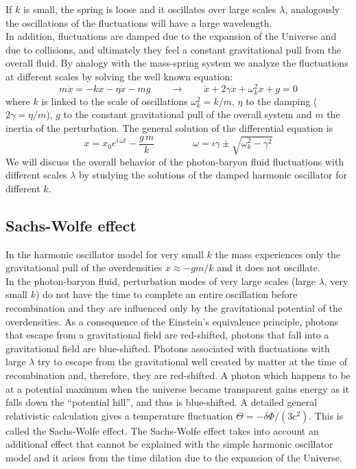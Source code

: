 \documentclass{article}
\begin{document}
If $k$ is small, the spring is loose and it  oscillates over large scales $\lambda$, analogously the oscillations of the fluctuations will have a large wavelength. \\ 
In addition, fluctuations are damped due to the expansion of the Universe and due to collisions, and ultimately they feel a constant gravitational pull from the overall fluid.
By analogy with the mass-spring system we analyze the fluctuations at different scales by solving the well known equation:
\begin{equation}
m\ddot{x} = - k x - \eta \dot{x} - m g \qquad \rightarrow \qquad \ddot{x} + 2 \gamma \dot{x} + \omega_k ^2 x + g =0
\end{equation}
where $k$ is linked to the scale of oscillations $\omega_k ^2 = k/m$, $\eta$ to the damping ($2 \gamma = \eta /m$), $g$ to the constant gravitational pull of the overall system and $m$ the inertia of the perturbation.
The general solution of the differential equation is 
\begin{equation}
x = x_0 e^{i \, \omega t} - \dfrac{g \, m}{k} \qquad \qquad \omega = i \gamma \pm \sqrt{ \omega_k ^2 - \gamma^2}
\end{equation}
We will discuss the overall behavior of the photon-baryon fluid fluctuations with different scales $\lambda$ by studying the solutions of the damped harmonic oscillator for different $k$.


\subsection{Sachs-Wolfe effect}
In the harmonic oscillator model for very small $k$ the mass experiences only the gravitational pull of the overdensities $x \approx - g m/k$ and it does not oscillate.\\
In the photon-baryon fluid, perturbation modes of very large scales (large $\lambda$, very small $k$) do not have the time to complete an entire oscillation before recombination and they are influenced only by the gravitational potential of the overdensities.
As a consequence of the Einstein's equivalence principle, photons that escape from a gravitational field are red-shifted, photons that fall into a gravitational field are blue-shifted.
Photons associated with fluctuations with large $\lambda$ try to escape from the gravitational well created by matter at the time of recombination and, therefore, they are red-shifted.
A photon which happens to be at a potential maximum when the universe became transparent gains energy as it falls down the “potential hill”, and thus is blue-shifted.
A detailed general relativistic calculation gives a temperature fluctuation $\Theta = -\delta \Phi /(3c^2)$.
This is called the Sachs-Wolfe effect.
The Sachs-Wolfe effect takes into account an additional effect that cannot be explained with the simple harmonic oscillator model and it arises from the time dilation due to the expansion of the Universe.
%
%
%
\end{document}
